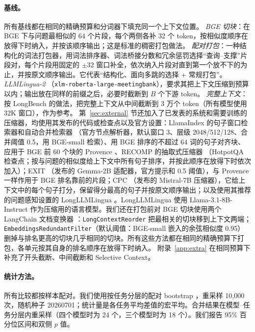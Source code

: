 \documentclass[11pt]{article}
\begin{document}
\paragraph{基线。}所有基线都在相同的精确预算和分词器下填充同一个上下文位置。
\emph{BGE 切块}：在 BGE 下与问题最相似的 64 个片段，每个两侧各补 32 个 token，按相似度顺序在放得下时纳入，并按该顺序输出；这是标准的稠密打包做法。
\emph{配对打包}：一种结构化的词法打包器，用词法排序器、词法桥接分数和冗余惩罚选择“查询--支撑”片段对，每个片段用固定的 $\pm$32 窗口补全，依次纳入片段对直到第一个放不下的为止，并按原文顺序输出。它代表“结构化、面向多跳的选择 + 常规打包”。
\emph{LLMLingua-2} \citep{pan2024llmlingua2}（\texttt{xlm-roberta-large-meetingbank}），要求其把上下文压缩到预算以内；输出放在同样的前缀之后，必要时截断到 $B$ 个下游 token。
\emph{完整上下文}：按 LongBench 的做法，把完整上下文从中间截断到 3 万个 token（所有模型使用 32K 窗口），作为参考。
第~\ref{sec:external} 节还加入了已发表的系统和需要训练的压缩器，均使用其发布的代码或检查点以及官方设置：LlamaIndex 的句子窗口检索器和自动合并检索器 \citep{liu2022llamaindex}（官方节点解析器，默认窗口 3、层级 2048/512/128、合并阈值 0.5，用 BGE-small 检索）、用 BGE 排序的不超过 64 词的句子对齐块、应用于 BGE 前 60 个块的 Provence \citep{chirkova2025provence}、RECOMP 的抽取式压缩器 \citep{xu2023recomp}（HotpotQA 检查点；按与问题的相似度给上下文中所有句子排序，并按此顺序在放得下时依次加入）；EXIT \citep{hwang2025exit}（发布的 Gemma-2B 适配器，官方提示和 0.5 阈值），与 Provence 一样作用于 BGE 排名靠前的片段；CPC \citep{liskavets2025cpc}（发布的 Mistral-7B 压缩器），它给上下文中的每个句子打分，保留得分最高的句子并按原文顺序输出；以及使用其推荐的问题感知设置的 LongLLMLingua \citep{jiang2024longllmlingua}。LongLLMLingua 使用 Llama-3.1-8B-Instruct 作为压缩用的语言模型。我们还在打包前对 BGE 切块使用两个 LangChain 文档变换器 \citep{chase2022langchain}：\texttt{LongContextReorder} 把最相关的切块移到上下文两端；\texttt{EmbeddingsRedundantFilter}（默认阈值：BGE-small 嵌入的余弦相似度 0.95）删掉与排名更高的切块几乎相同的切块。所有这些方法都在相同的精确预算下打包，各单元按其自身的排名顺序在放得下时纳入。
附录~\ref{app:extra} 在相同预算下补充了开头截断、中间截断和 Selective Context。

\paragraph{统计方法。}所有比较都按样本配对。我们使用按任务分层的配对 bootstrap \citep{efron1993bootstrap}，重采样 10,000 次，随机种子 20260701；统计量是各任务平均差值的宏平均。合并结果在模型--任务分层内重采样（四个模型时为 24 个，三个模型时为 18 个）。我们报告 95\% 百分位区间和双侧 $p$ 值。
\end{document}
